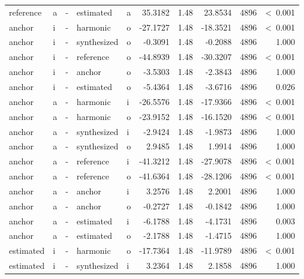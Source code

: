 \documentclass[a4paper,man,hidelinks,floatsintext]{apa7}
\begin{document}
\begin{table}[!htbp]
\begin{adjustbox}{max size={\columnwidth}{\textheight}}
\begin{tabular}{llrllrrrrr}
reference   & a     & - & estimated   & a     &    35.3182 & 1.48 &  23.8534 & 4896 &  \textless~0.001 \\
anchor      & i     & - & harmonic    & o     &   -27.1727 & 1.48 & -18.3521 & 4896 &  \textless~0.001 \\
anchor      & i     & - & synthesized & o     &    -0.3091 & 1.48 &  -0.2088 & 4896 &            1.000 \\
anchor      & i     & - & reference   & o     &   -44.8939 & 1.48 & -30.3207 & 4896 &  \textless~0.001 \\
anchor      & i     & - & anchor      & o     &    -3.5303 & 1.48 &  -2.3843 & 4896 &            1.000 \\
anchor      & i     & - & estimated   & o     &    -5.4364 & 1.48 &  -3.6716 & 4896 &            0.026 \\
anchor      & a     & - & harmonic    & i     &   -26.5576 & 1.48 & -17.9366 & 4896 &  \textless~0.001 \\
anchor      & a     & - & harmonic    & o     &   -23.9152 & 1.48 & -16.1520 & 4896 &  \textless~0.001 \\
anchor      & a     & - & synthesized & i     &    -2.9424 & 1.48 &  -1.9873 & 4896 &            1.000 \\
anchor      & a     & - & synthesized & o     &     2.9485 & 1.48 &   1.9914 & 4896 &            1.000 \\
anchor      & a     & - & reference   & i     &   -41.3212 & 1.48 & -27.9078 & 4896 &  \textless~0.001 \\
anchor      & a     & - & reference   & o     &   -41.6364 & 1.48 & -28.1206 & 4896 &  \textless~0.001 \\
anchor      & a     & - & anchor      & i     &     3.2576 & 1.48 &   2.2001 & 4896 &            1.000 \\
anchor      & a     & - & anchor      & o     &    -0.2727 & 1.48 &  -0.1842 & 4896 &            1.000 \\
anchor      & a     & - & estimated   & i     &    -6.1788 & 1.48 &  -4.1731 & 4896 &            0.003 \\
anchor      & a     & - & estimated   & o     &    -2.1788 & 1.48 &  -1.4715 & 4896 &            1.000 \\
estimated   & i     & - & harmonic    & o     &   -17.7364 & 1.48 & -11.9789 & 4896 &  \textless~0.001 \\
estimated   & i     & - & synthesized & i     &     3.2364 & 1.48 &   2.1858 & 4896 &            1.000 \\

\end{tabular}
\end{adjustbox}
\end{table}
\end{document}
